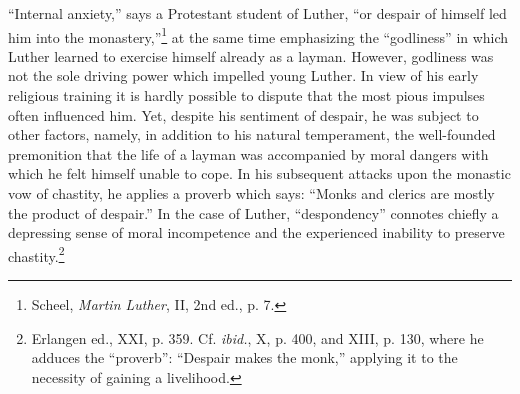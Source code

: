“Internal anxiety,” says a Protestant student of Luther, “or despair
of himself led him into the monastery,”\footnote{Scheel, \textit{Martin Luther}, II, 2nd ed., p. 7.}
at the same time emphasizing the “godliness” in which Luther learned to exercise himself
already as a layman. However, godliness was not the sole driving
power which impelled young Luther. In view of his early religious
training it is hardly possible to dispute that the most pious impulses
often influenced him. Yet, despite his sentiment of despair, he was
subject to other factors, namely, in addition to his natural temperament,
the well-founded premonition that the life of a layman was
accompanied by moral dangers with which he felt himself unable
to cope. In his subsequent attacks upon the monastic vow of chastity,
he applies a proverb which says: “Monks and clerics are mostly the
product of despair.” In the case of Luther, “despondency” connotes
chiefly a depressing sense of moral incompetence and the experienced inability to preserve chastity.\footnote
{Erlangen ed., XXI, p. 359. Cf. \textit{ibid.}, X, p. 400, and XIII, p. 130, where he adduces
the “proverb”: “Despair makes the monk,” applying it to the necessity of gaining a livelihood.}

